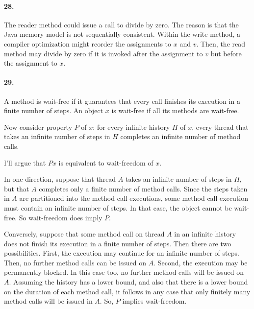 \documentclass[
]{article}
\begin{document}
\paragraph{28.} The reader method could issue a call to divide by zero.  The reason is that the Java memory model is not sequentially consistent.  Within the write method, a compiler optimization might reorder the assignments to $x$ and $v$.  Then, the read method may divide by zero if it is invoked after the assignment to $v$ but before the assignment to $x$.

\paragraph{29.} A method is wait-free if it guarantees that every call finishes its execution in a finite number of steps.  An object $x$ is wait-free if all its methods are wait-free.

Now consider property $P$ of $x$:  for every infinite history $H$ of $x$, every thread that takes an infinite number of steps in $H$ completes an infinite number of method calls.

I'll argue that $Px$ is equivalent to wait-freedom of $x$.

In one direction, suppose that thread $A$ takes an infinite number of steps in $H$, but that $A$ completes only a finite number of method calls.  Since the steps taken in $A$ are partitioned into the method call executions, some method call execution must contain an infinite number of steps.  In that case, the object cannot be wait-free.  So wait-freedom does imply $P$.

Conversely, suppose that some method call on thread $A$ in an infinite history does not finish its execution in a finite number of steps.  Then there are two possibilities.  First, the execution may continue for an infinite number of steps.  Then, no further method calls can be issued on $A$.  Second, the execution may be permanently blocked.  In this case too, no further method calls will be issued on $A$.  Assuming the history has a lower bound, and also that there is a lower bound on the duration of each method call, it follows in any case that only finitely many  method calls will be issued in $A$.  So, $P$ implies wait-freedom.


\end{document}
